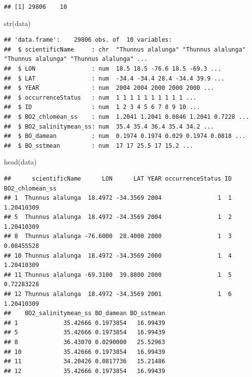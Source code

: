 \documentclass[
]{book}
\newenvironment{Shaded}{\begin{snugshade}}{\end{snugshade}}
\newcommand{\FunctionTok}[1]{\textcolor[rgb]{0.00,0.00,0.00}{#1}}
\newcommand{\NormalTok}[1]{#1}
\begin{document}
\begin{verbatim}
## [1] 29806    10
\end{verbatim}

\begin{Shaded}
\begin{Highlighting}[]
\FunctionTok{str}\NormalTok{(data)}
\end{Highlighting}
\end{Shaded}

\begin{verbatim}
## 'data.frame':    29806 obs. of  10 variables:
##  $ scientificName     : chr  "Thunnus alalunga" "Thunnus alalunga" "Thunnus alalunga" "Thunnus alalunga" ...
##  $ LON                : num  18.5 18.5 -76.6 18.5 -69.3 ...
##  $ LAT                : num  -34.4 -34.4 28.4 -34.4 39.9 ...
##  $ YEAR               : num  2004 2004 2000 2000 2000 ...
##  $ occurrenceStatus   : num  1 1 1 1 1 1 1 1 1 1 ...
##  $ ID                 : num  1 2 3 4 5 6 7 8 9 10 ...
##  $ BO2_chlomean_ss    : num  1.2041 1.2041 0.0846 1.2041 0.7228 ...
##  $ BO2_salinitymean_ss: num  35.4 35.4 36.4 35.4 34.2 ...
##  $ BO_damean          : num  0.1974 0.1974 0.029 0.1974 0.0818 ...
##  $ BO_sstmean         : num  17 17 25.5 17 15.2 ...
\end{verbatim}

\begin{Shaded}
\begin{Highlighting}[]
\FunctionTok{head}\NormalTok{(data)}
\end{Highlighting}
\end{Shaded}

\begin{verbatim}
##      scientificName      LON      LAT YEAR occurrenceStatus ID BO2_chlomean_ss
## 1  Thunnus alalunga  18.4972 -34.3569 2004                1  1      1.20410309
## 5  Thunnus alalunga  18.4972 -34.3569 2004                1  2      1.20410309
## 8  Thunnus alalunga -76.6000  28.4000 2000                1  3      0.08455528
## 10 Thunnus alalunga  18.4972 -34.3569 2000                1  4      1.20410309
## 11 Thunnus alalunga -69.3100  39.8800 2000                1  5      0.72283228
## 12 Thunnus alalunga  18.4972 -34.3569 2001                1  6      1.20410309
##    BO2_salinitymean_ss BO_damean BO_sstmean
## 1             35.42666 0.1973854   16.99439
## 5             35.42666 0.1973854   16.99439
## 8             36.43070 0.0290000   25.52963
## 10            35.42666 0.1973854   16.99439
## 11            34.20426 0.0817736   15.21486
## 12            35.42666 0.1973854   16.99439
\end{verbatim}
\end{document}
